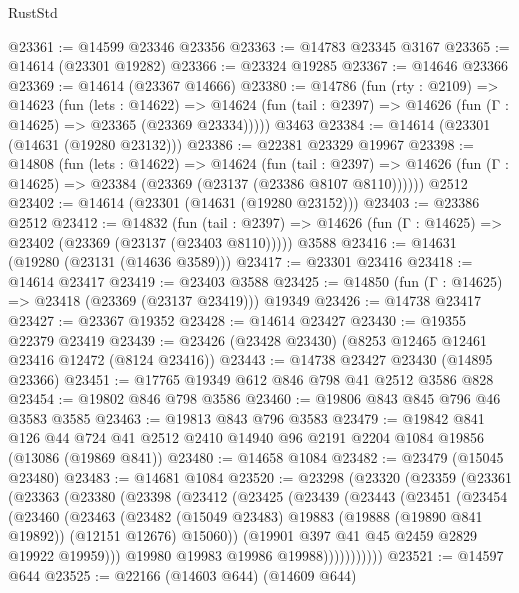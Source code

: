 \begin{lexlean}{RustStd}
\begin{coremodule}
@23361 := @14599 @23346 @23356
@23363 := @14783 @23345 @3167
@23365 := @14614 (@23301 @19282)
@23366 := @23324 @19285
@23367 := @14646 @23366
@23369 := @14614 (@23367 @14666)
@23380 := @14786
    (fun (rty : @2109) =>
    @14623
      (fun (lets : @14622) =>
      @14624 (fun (tail : @2397) => @14626 (fun (Γ : @14625) => @23365 (@23369 @23334)))))
    @3463
@23384 := @14614 (@23301 (@14631 (@19280 @23132)))
@23386 := @22381 @23329 @19967
@23398 := @14808
    (fun (lets : @14622) =>
    @14624
      (fun (tail : @2397) =>
      @14626 (fun (Γ : @14625) => @23384 (@23369 (@23137 (@23386 @8107 @8110))))))
    @2512
@23402 := @14614 (@23301 (@14631 (@19280 @23152)))
@23403 := @23386 @2512
@23412 := @14832
    (fun (tail : @2397) => @14626 (fun (Γ : @14625) => @23402 (@23369 (@23137 (@23403 @8110)))))
    @3588
@23416 := @14631 (@19280 (@23131 (@14636 @3589)))
@23417 := @23301 @23416
@23418 := @14614 @23417
@23419 := @23403 @3588
@23425 := @14850 (fun (Γ : @14625) => @23418 (@23369 (@23137 @23419))) @19349
@23426 := @14738 @23417
@23427 := @23367 @19352
@23428 := @14614 @23427
@23430 := @19355 @22379 @23419
@23439 := @23426 (@23428 @23430) (@8253 @12465 @12461 @23416 @12472 (@8124 @23416))
@23443 := @14738 @23427 @23430 (@14895 @23366)
@23451 := @17765 @19349 @612 @846 @798 @41 @2512 @3586 @828
@23454 := @19802 @846 @798 @3586
@23460 := @19806 @843 @845 @796 @46 @3583 @3585
@23463 := @19813 @843 @796 @3583
@23479 := @19842
    @841
    @126
    @44
    @724
    @41
    @2512
    @2410
    @14940
    @96
    @2191
    @2204
    @1084
    @19856
    (@13086 (@19869 @841))
@23480 := @14658 @1084
@23482 := @23479 (@15045 @23480)
@23483 := @14681 @1084
@23520 := @23298
    (@23320
      (@23359
        (@23361
          (@23363
            (@23380
              (@23398
                (@23412
                  (@23425
                    (@23439
                      (@23443
                        (@23451
                          (@23454
                            (@23460
                              (@23463
                                (@23482
                                  (@15049 @23483)
                                  @19883
                                  (@19888 (@19890 @841 @19892))
                                  (@12151 @12676)
                                  @15060))
                              (@19901 @397 @41 @45 @2459 @2829 @19922 @19959)))
                          @19980
                          @19983
                          @19986
                          @19988)))))))))))
@23521 := @14597 @644
@23525 := @22166 (@14603 @644) (@14609 @644)

\end{coremodule}
\end{lexlean}
